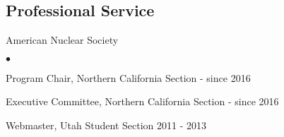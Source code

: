 \documentclass[margin,line]{res}
\newenvironment{list1}{
  \begin{list}{\ding{113}}{%
      \setlength{\itemsep}{0in}
      \setlength{\parsep}{0in} \setlength{\parskip}{0in}
      \setlength{\topsep}{0in} \setlength{\partopsep}{0in} 
      \setlength{\leftmargin}{0.17in}}}{\end{list}}
\newenvironment{list2}{
  \begin{list}{$\bullet$}{%
      \setlength{\itemsep}{0in}
      \setlength{\parsep}{0in} \setlength{\parskip}{0in}
      \setlength{\topsep}{0in} \setlength{\partopsep}{0in} 
      \setlength{\leftmargin}{0.2in}}}{\end{list}}
\begin{document}
\begin{resume}
% 
% 
% 
% 
% 
% 
% 
% 





\section{\sc Professional Service} 
\begin{list1}
\item[] American Nuclear Society  
\begin{list2}
\item Program Chair, Northern California Section \hfill{ - since 2016}
\item Executive Committee, Northern California Section \hfill{ - since 2016}
\item Webmaster, Utah Student Section \hfill{2011 -  2013}
\end{list2}
\end{list1}




\end{resume}
\end{document}
